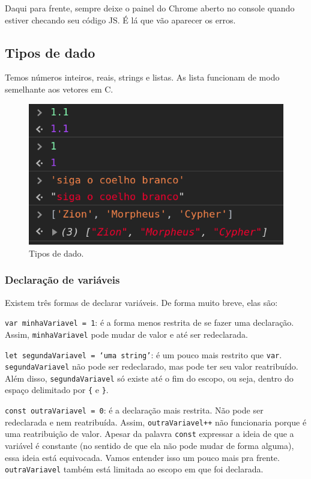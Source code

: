 Daqui para frente, sempre deixe o painel do Chrome aberto no console
quando estiver checando seu código JS. É lá que vão aparecer os erros.

\subsection{Tipos de dado}
Temos números inteiros, reais, strings e listas. As lista funcionam de modo semelhante aos vetores em C.

\begin{figure}[h!]
    \centering
    \includegraphics[scale=.5]{imgs/data-types.png}
    \caption{Tipos de dado.}
    \label{fig:data-types}
\end{figure}


\subsubsection{Declaração de variáveis}

Existem três formas de declarar variáveis. De forma muito breve, elas
são:

\texttt{var minhaVariavel = 1}: é a forma menos restrita de se fazer
uma declaração. Assim, \texttt{minhaVariavel} pode mudar de valor e até
ser redeclarada.

\texttt{let segundaVariavel = `uma string'}:
é um pouco mais restrito que \texttt{var}. \texttt{segundaVariavel} não
pode ser redeclarado, mas pode ter seu valor  reatribuído. Além disso,
\texttt{segundaVariavel} só existe até o fim do escopo, ou seja, dentro
do espaço delimitado por \texttt{\{} e \texttt{\}}.

\texttt{const outraVariavel = 0}: é a declaração mais restrita. Não
pode ser redeclarada e nem reatribuída. Assim, \texttt{outraVariavel++}
não funcionaria porque é uma reatribuição de valor. Apesar da palavra
\texttt{const} expressar a ideia de que a variável é constante (no
sentido de que ela não pode mudar de forma alguma), essa ideia está
equivocada. Vamos entender isso um pouco mais pra frente.
\texttt{outraVariavel} também está limitada ao escopo em que foi
declarada.

